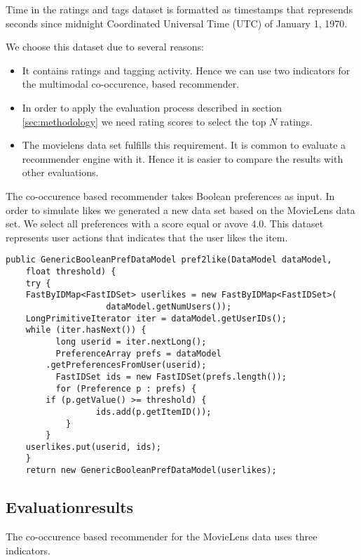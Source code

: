 Time in the ratings and tags dataset is formatted as timestamps that represends seconds since midnight Coordinated Universal Time (UTC) of January 1, 1970.
 
We choose this dataset due to several reasons:
\begin{itemize}
\item It contains ratings and tagging activity. Hence we can use two indicators for the multimodal co-occurence, based recommender.
\item In order to apply the evaluation process described in section \ref{sec:methodology} we need rating scores to select the top $N$ ratings.
\item The movielens data set fulfills this requirement. It is common to evaluate a recommender engine with it. Hence it is easier to compare the results with other evaluations. 
\end{itemize}

The co-occurence based recommender takes Boolean preferences as input. In order to simulate likes we generated a new data set based on the MovieLens data set. We select all preferences with a score  equal or avove 4.0. This dataset represents user actions that indicates that the user likes the item.

\begin{lstlisting}[caption={To simulate the user action ``like'' we extract all ratings equal or above a score of 4.0 and use the result as training set},label={lst:pref2like}]
 public GenericBooleanPrefDataModel pref2like(DataModel dataModel,
	float threshold) {
	try {
	FastByIDMap<FastIDSet> userlikes = new FastByIDMap<FastIDSet>(
					dataModel.getNumUsers());
	LongPrimitiveIterator iter = dataModel.getUserIDs();
	while (iter.hasNext()) {
          long userid = iter.nextLong();
          PreferenceArray prefs = dataModel
		.getPreferencesFromUser(userid);
          FastIDSet ids = new FastIDSet(prefs.length());
          for (Preference p : prefs) {
		if (p.getValue() >= threshold) {
                  ids.add(p.getItemID());
			}
		}
	userlikes.put(userid, ids);
	}
    return new GenericBooleanPrefDataModel(userlikes);
\end{lstlisting}

\subsection{Evaluationresults}
\label{sec:results}
The co-occurence based recommender for the MovieLens data uses three \glspl{indicator}.

